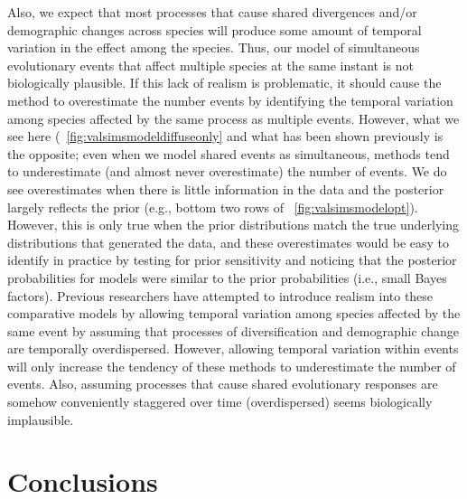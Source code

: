 Also, we expect that most processes that cause shared divergences and/or
demographic changes across species will produce some amount of temporal
variation in the effect among the species.
Thus, our model of simultaneous evolutionary events that affect multiple
species at the same instant is not biologically plausible.
If this lack of realism is problematic, it should cause the method to
overestimate the number events by identifying the temporal variation among
species affected by the same process as multiple events.
However, what we see here
(\fig{}~\ref{fig:valsimsmodeldiffuseonly}
and what has been shown previously
\citep{Oaks2012,Oaks2014reply,Oaks2014dpp,Oaks2018ecoevolity,Oaks2018paic}
is the opposite;
even when we model shared events as simultaneous, methods tend to underestimate
(and almost never overestimate) the number of events.
We do see overestimates when there is little information in the data
and the posterior largely reflects the prior 
(e.g., bottom two rows of \fig{}~\ref{fig:valsimsmodelopt}).
However, this is only true when the prior distributions match the true
underlying distributions that generated the data, and these overestimates would
be easy to identify in practice by testing for prior sensitivity and noticing
that the posterior probabilities for models were similar to the prior
probabilities (i.e., small Bayes factors).
Previous researchers
\citep{Overcast2017,Gehara2017,Xue2017}
have attempted to introduce realism into these comparative models by allowing
temporal variation among species affected by the same event by assuming that
processes of diversification and demographic change are temporally
overdispersed.
However, allowing temporal variation within events will only increase the
tendency of these methods to underestimate the number of events.
Also, assuming processes that cause shared evolutionary responses are somehow
conveniently staggered over time (overdispersed) seems biologically
implausible.

\section{Conclusions}


